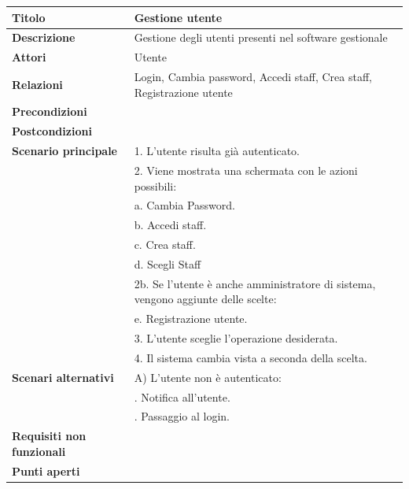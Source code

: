 \documentclass[a4paper]{article}
\begin{document}

\begin{center}
\begin{tabularx}{1\textwidth}{|l|X|}
    \hline
	\textbf{Titolo} & Gestione utente \\
	\hline
	\textbf{Descrizione} & Gestione degli utenti presenti nel software gestionale \\
	\hline
	\textbf{Attori} & Utente \\
	\hline
	\textbf{Relazioni} & Login, Cambia password, Accedi staff, Crea staff, Registrazione utente \\
	\hline
	\textbf{Precondizioni} &  \\
	\hline
	\textbf{Postcondizioni} &  \\
	\hline
	\textbf{Scenario principale} & 1. L'utente risulta già autenticato.\\
	                             & 2. Viene mostrata una schermata con le azioni possibili:\\
								 & \quad a. Cambia Password.\\
								 & \quad b. Accedi staff.\\
								 & \quad c. Crea staff.\\
								 & \quad d. Scegli Staff\\
								 & 2b. Se l'utente è anche amministratore di sistema, vengono aggiunte delle scelte:\\
								 & \quad e. Registrazione utente.\\
								 & 3. L'utente sceglie l'operazione desiderata.\\
								 & 4. Il sistema cambia vista a seconda della scelta.\\
	\hline
	\textbf{Scenari alternativi} & A) L'utente non è autenticato: \\
								 & \quad 1. Notifica all'utente.\\
								 & \quad 2. Passaggio al login.\\
	\hline
	\textbf{Requisiti non funzionali} & \\
	\hline
	\textbf{Punti aperti} & \\
	\hline
\end{tabularx}
\end{center}
\end{document}
